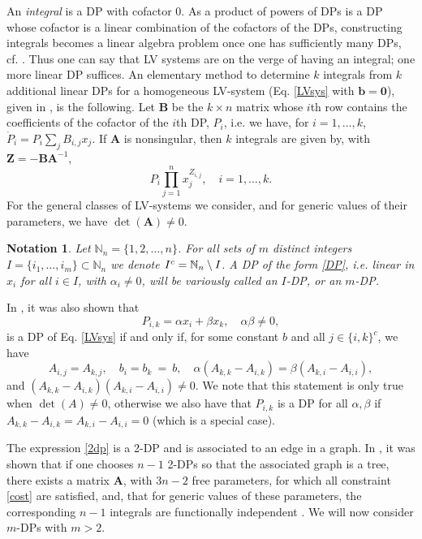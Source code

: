 \documentclass{article}
\newcounter{NN}
\newtheorem{notation}[NN]{Notation}
\def\N{\mathbb{N}}
\def\A{\mathbf{A}}
\def\B{\mathbf{B}}
\def\Z{\mathbf{Z}}
\def\b{{\mathbf b}}
\begin{document}
An {\em integral} is a DP with cofactor 0. As a product of powers of DPs is a DP whose cofactor is a linear combination of the cofactors of the DPs, constructing integrals becomes a linear algebra problem once one has sufficiently many DPs, cf. \cite{Gor}. Thus one can say that LV systems are on the verge of having an integral; one more linear DP suffices. An elementary method to determine $k$ integrals from $k$ additional linear DPs for a homogeneous LV-system (Eq. \eqref{LVsys} with $\b=\mathbf{0}$), given in \cite[Section 2]{QTMK}, is the following. Let $\B$ be the $k\times n$ matrix whose $i$th row contains the coefficients of the cofactor of the $i$th DP, $P_i$, i.e. we have, for $i=1,\ldots,k$,  $\dot{P}_i=P_i\sum_j B_{i,j}x_j$. If $\A$ is nonsingular, then $k$ integrals are given by, with $\Z=-\B\A^{-1}$,
\begin{equation} \label{Ik}
P_{i}\prod_{j=1}^n x_j^{Z_{i,j}},\quad i=1,\ldots,k.
\end{equation}
For the general classes of LV-systems we consider, and for generic values of their parameters, we have $\det(\A)\neq 0$.
\begin{notation}
Let $\N_n=\{1,2,\ldots,n\}$. For all sets of $m$ distinct integers $I=\{i_1,\ldots,i_m\}\subset \N_n$ we denote $I^{\rm c}=\N_n \setminus I$. A DP of the form \eqref{DP}, i.e. linear in $x_i$ for all $i\in I$, with $\alpha_i\neq 0$, will be variously called an $I$-DP, or an $m$-DP.
\end{notation}
In \cite{QTMK}, it was also shown that 
\begin{equation} \label{2dp}
P_{i,k} = \alpha x_i + \beta x_k,\quad \alpha\beta\neq0,
\end{equation}
is a DP of Eq. \eqref{LVsys} if and only if, for some constant $b$ and all $j\in \{i,k \}^c$, we have
\begin{equation} \label{cost}
A_{i,j} = A_{k,j},\quad
b_i = b_k\ =\ b,\quad
\alpha (A_{k,k}-A_{i,k}) = \beta (A_{k,i}-A_{i,i}),
\end{equation}
and $(A_{k,k}-A_{i,k})(A_{k,i}-A_{i,i})\neq 0$. We note that this statement is only true when $\det(A)\neq0$, otherwise we also have that $P_{i,k}$ is a DP for all $\alpha,\beta$ if $A_{k,k}-A_{i,k}=A_{k,i}-A_{i,i}=0$ (which is a special case).

The expression \eqref{2dp} is a 2-DP and is associated to an edge in a graph. In \cite{trees}, it was shown that if one chooses $n-1$ 2-DPs so that the associated graph is a tree, there exists a matrix $\A$, with $3n-2$ free parameters, for which all constraint \eqref{cost} are satisfied, and, that for generic values of these parameters, the corresponding $n-1$ integrals are functionally independent \cite{trees}. We will now consider $m$-DPs with $m>2$.
\end{document}
